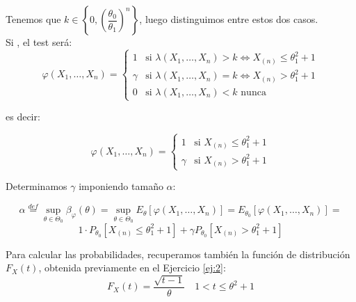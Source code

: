 \documentclass[12pt]{article}
\begin{document}
\begin{ejercicio}
\begin{figure}[H]
        \end{figure}

        Tenemos que $k \in \left\{0, \left( \dfrac{\theta_0}{\theta_1} \right)^{n} \right\}$, luego distinguimos entre estos dos casos. \\

        Si , el test será:
        $$\varphi(X_1, \ldots, X_n) = \begin{cases}
            1 &\text{si } \lambda(X_1, \ldots, X_n) > k \iff X_{(n)} \leq \theta_1^2 + 1 \\
            \gamma &\text{si } \lambda(X_1, \ldots, X_n) = k \iff X_{(n)} > \theta_1^2 + 1 \\
            0 &\text{si } \lambda(X_1, \ldots, X_n) < k \text{ nunca}
        \end{cases}$$

        es decir:

        $$\varphi(X_1, \ldots, X_n) = \begin{cases}
            1 &\text{si } X_{(n)} \leq \theta_1^2 + 1 \\
            \gamma &\text{si } X_{(n)} > \theta_1^2 + 1
        \end{cases}$$

        Determinamos $\gamma$ imponiendo tamaño $\alpha$:

        $$\alpha \stackrel{def} = \sup_{\theta \in \Theta_0} \beta_{\varphi}(\theta) =  \sup_{\theta \in \Theta_0} E_\theta[\varphi(X_1, \ldots, X_n)] = E_{\theta_0}[\varphi(X_1, \ldots, X_n)] = $$
        $$1 \cdot P_{\theta_0}[X_{(n)} \leq \theta_1^2 + 1] + \gamma P_{\theta_0}[X_{(n)} > \theta_1^2 + 1] $$

        Para calcular las probabilidades, recuperamos también la función de distribución $F_X(t)$, obtenida previamente en el Ejercicio \ref{ej:2}:
        $$F_X(t) = \dfrac{\sqrt{t-1}}{\theta} \quad 1 < t \leq \theta^2+1$$


\end{ejercicio}
\end{document}
